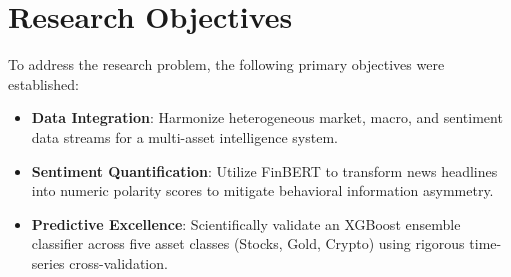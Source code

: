 \section{Research Objectives}
To address the research problem, the following primary objectives were established:
\begin{itemize}
    \item \textbf{Data Integration}: Harmonize heterogeneous market, macro, and sentiment data streams for a multi-asset intelligence system.
    \item \textbf{Sentiment Quantification}: Utilize FinBERT to transform news headlines into numeric polarity scores to mitigate behavioral information asymmetry.
    \item \textbf{Predictive Excellence}: Scientifically validate an XGBoost ensemble classifier across five asset classes (Stocks, Gold, Crypto) using rigorous time-series cross-validation.
\end{itemize}